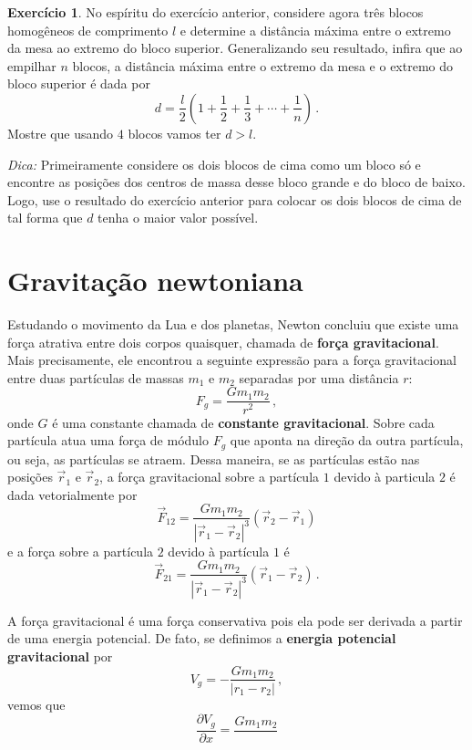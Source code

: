 \documentclass[papersize=a4,DIV=calc,twocolumn=on]{scrartcl}
\newcommand{\dpar}[1]{\left(#1\right)}
\theoremstyle{definition}
\newtheorem{ex}{Exercício}[section]
\begin{document}
\begin{ex}
  No espíritu do exercício anterior, considere agora três blocos
  homogêneos de comprimento $l$ e determine a distância máxima entre o
  extremo da mesa ao extremo do bloco superior. Generalizando seu
  resultado, infira que ao empilhar $n$ blocos, a distância máxima
  entre o extremo da mesa e o extremo do bloco superior é dada por
  $$d=\frac{l}{2}\dpar{1+\frac{1}{2}+\frac{1}{3}+\cdots+\frac{1}{n}}\,.$$
  Mostre que usando $4$ blocos vamos ter $d>l$.

  \noindent\textit{Dica:} Primeiramente considere os dois blocos de
  cima como um bloco só e encontre as posições dos centros de massa
  desse bloco grande e do bloco de baixo. Logo, use o resultado do
  exercício anterior para colocar os dois blocos de cima de tal forma
  que $d$ tenha o maior valor possível.
\end{ex}

\section{Gravitação newtoniana}

Estudando o movimento da Lua e dos planetas, Newton concluiu que
existe uma força atrativa entre dois corpos quaisquer, chamada de
\textbf{força gravitacional}. Mais precisamente, ele encontrou a
seguinte expressão para a força gravitacional entre duas partículas de
massas $m_1$ e $m_2$ separadas por uma distância $r$:
$$F_g=\frac{Gm_1m_2}{r^2}\,,$$
onde $G$ é uma constante chamada de \textbf{constante gravitacional}.
Sobre cada partícula atua uma força de módulo $F_g$ que aponta na
direção da outra partícula, ou seja, as partículas se atraem. Dessa
maneira, se as partículas estão nas posições $\vec r_1$ e $\vec r_2$,
a força gravitacional sobre a partícula $1$ devido à particula $2$ é
dada vetorialmente por
$$\vec F_{12}=\frac{Gm_1m_2}{|\vec r_1-\vec r_2|^3}(\vec r_2-\vec r_1)$$
e a força sobre a partícula $2$ devido à partícula $1$ é
$$\vec F_{21}=\frac{Gm_1m_2}{|\vec r_1-\vec r_2|^3}(\vec r_1-\vec r_2)\,.$$

A força gravitacional é uma força conservativa pois ela pode ser derivada a partir de uma energia potencial. De fato, se definimos a \textbf{energia potencial gravitacional} por
$$V_g=-\frac{Gm_1m_2}{|r_1-r_2|}\,,$$
vemos que
$$\frac{\partial V_g}{\partial x}=\frac{Gm_1m_2}{}$$
\end{document}
